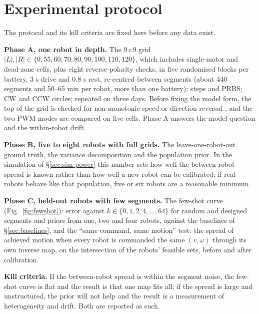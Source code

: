 \section{Experimental protocol}\label{sec:protocol}

The protocol and its kill criteria are fixed here before any data
exist. 

\textbf{Phase A, one robot in depth.} The 9×9 grid
\(|L|, |R| \in \{0, 55, 60, 70, 80, 90, 100, 110, 120\}\), which
includes single-motor and dead-zone cells, plus eight reverse-polarity
checks, in five randomised blocks per battery, 3 s drive and
0.8 s rest, re-centred between segments (about 440 segments and 50--65
min per robot, more than one battery); steps and PRBS; CW and CCW
circles; repeated on three days. Before fixing the model form, the top
of the grid is checked for non-monotonic speed or direction reversal
\cite{cicconofri2016inversion, kim2020millibristle}, and the two PWM
modes are compared on five cells. Phase A answers the model question and
the within-robot drift.

\textbf{Phase B, five to eight robots with full grids.} The
leave-one-robot-out ground truth, the variance decomposition and the
population prior. In the simulation of §\ref{sec:sim-power} this
number sets how well the between-robot spread is known rather than how
well a new robot can be calibrated; if real robots behave like that
population, five or six robots are a reasonable minimum.

\textbf{Phase C, held-out robots with few segments.} The few-shot curve
(Fig.~\ref{fig:fewshot}): error against \(k \in \{0, 1, 2, 4, \dots,
64\}\) for random and designed segments and priors from one, two and
four robots, against the baselines of §\ref{sec:baselines}, and the ``same command, same motion'' test: the
spread of achieved motion when every robot is commanded the same
\((v,\omega)\) through its own inverse map, on the intersection of the
robots' feasible sets, before and after calibration.

\textbf{Kill criteria.} If the between-robot spread is within the
segment noise, the few-shot curve is flat and the result is that one map
fits all; if the spread is large and unstructured, the prior will not
help and the result is a measurement of heterogeneity and drift. Both
are reported as such.
